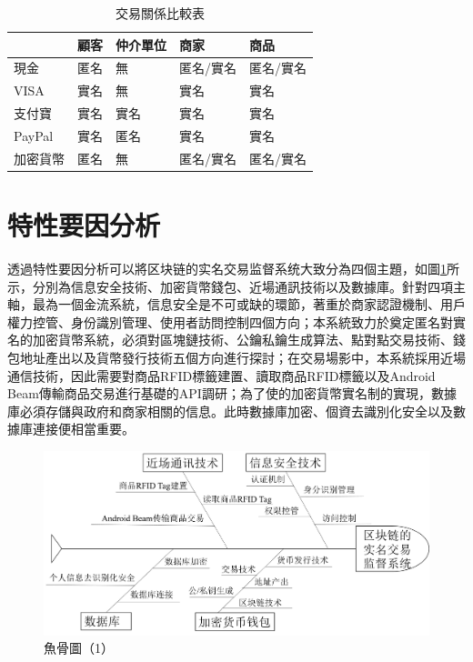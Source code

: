		\begin{table}[!htbp]
		\centering
		\caption{交易關係比較表}
		\label{txvs}
		\begin{tabular}{|l|l|l|l|l|}
		\hline
		 & 顧客 & 仲介單位 & 商家 & 商品 \\ \hline
		現金 & 匿名 & 無 & 匿名/實名 & 匿名/實名 \\ \hline
		VISA & 實名 & 無 & 實名 & 實名 \\ \hline
		支付寶 & 實名 & 實名 & 實名 & 實名 \\ \hline
		PayPal & 實名 & 匿名 & 實名 & 實名 \\ \hline
		加密貨幣 & 匿名 & 無 & 匿名/實名 & 匿名/實名 \\ \hline
		\end{tabular}
		\end{table}

	\section{特性要因分析}
	透過特性要因分析可以將区块链的实名交易监督系统大致分為四個主題，如圖\ref{fish1}所示，分別為信息安全技術、加密貨幣錢包、近場通訊技術以及數據庫。針對四項主軸，最為一個金流系統，信息安全是不可或缺的環節，著重於商家認證機制、用戶權力控管、身份識別管理、使用者訪問控制四個方向；本系統致力於奠定匿名對實名的加密貨幣系統，必須對區塊鏈技術、公鑰私鑰生成算法、點對點交易技術、錢包地址產出以及貨幣發行技術五個方向進行探討；在交易場影中，本系統採用近場通信技術，因此需要對商品RFID標籤建置、讀取商品RFID標籤以及Android Beam傳輸商品交易進行基礎的API調研；為了使的加密貨幣實名制的實現，數據庫必須存儲與政府和商家相關的信息。此時數據庫加密、個資去識別化安全以及數據庫連接便相當重要。
		\begin{figure}[!htbp]
			\centering
			\includegraphics[width = 1\textwidth]{fish1.png}
			\caption{魚骨圖（1）}\label{fish1}
		\end{figure}


